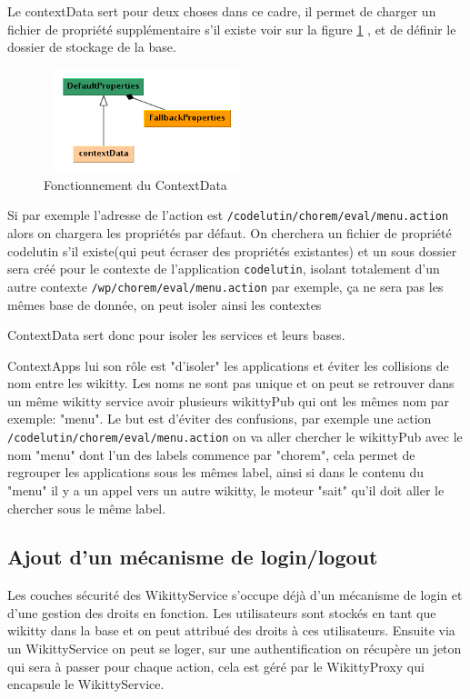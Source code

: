 Le contextData sert pour deux choses dans ce cadre, il permet de charger un 
fichier de propriété supplémentaire s'il existe voir sur la figure 
\ref{propertiescontext} , et de définir le dossier de stockage de la base. 

\begin{figure}[!ht]
\centering
\includegraphics[height=3cm,width=6cm]{image/propertiescontext.png}
  		\caption{Fonctionnement du ContextData}
  		\label{propertiescontext}
\end{figure}

Si par exemple l'adresse de l'action est \verb!/codelutin/chorem/eval/menu.action!
alors on chargera les propriétés par défaut. On cherchera un fichier de propriété
codelutin s'il existe(qui peut écraser des propriétés existantes) et un sous dossier
sera créé pour le contexte de l'application \verb!codelutin!, isolant totalement
d'un autre contexte \verb!/wp/chorem/eval/menu.action! par exemple, ça ne sera
pas les mêmes base de donnée, on peut isoler ainsi les contextes

ContextData sert donc pour isoler les services et leurs bases.

ContextApps lui son rôle est "d'isoler" les applications et éviter les collisions
de nom entre les wikitty. Les noms ne sont pas unique et on peut se retrouver
dans un même wikitty service avoir plusieurs wikittyPub qui ont les mêmes nom par
exemple: "menu". Le but est d'éviter des confusions, par exemple une action
\verb!/codelutin/chorem/eval/menu.action! on va aller chercher le wikittyPub 
avec le nom "menu" dont l'un des labels commence par "chorem", cela permet de 
regrouper les applications sous les mêmes label, ainsi si dans le contenu du 
"menu" il y a un appel vers un autre wikitty, le moteur "sait" qu'il doit 
aller le chercher sous le même label.


\subsection{Ajout d'un mécanisme de login/logout}

Les couches sécurité des WikittyService s'occupe déjà d'un mécanisme de login
et d'une gestion des droits en fonction. Les utilisateurs sont stockés en tant
que wikitty dans la base et on peut attribué des droits à ces utilisateurs.
Ensuite via un WikittyService on peut se loger, sur une authentification on
récupère un jeton qui sera à passer pour chaque action, cela est géré par le
WikittyProxy qui encapsule le WikittyService.

